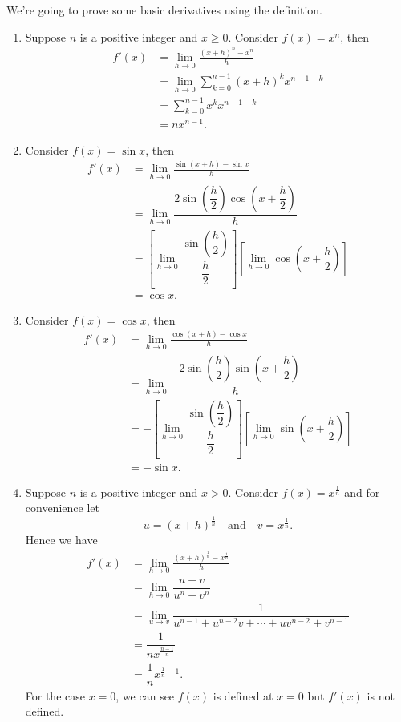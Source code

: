 \documentclass[a4paper]{ctexart}
\begin{document}
	\begin{myex}
		We're going to prove some basic derivatives using the definition.
		\begin{enumerate}
			\item Suppose $n$ is a positive integer and $x\ge 0$. Consider $f(x)=x^n$, then
			\[
			\begin{aligned}
				f'(x) &= \lim_{h\to 0} \frac{(x+h)^n - x^n}{h}\\ &= \lim_{h\to 0} \sum_{k=0}^{n-1} (x+h)^k x^{n-1-k}\\ &= \sum_{k=0}^{n-1} x^k x^{n-1-k}\\ &= n x^{n-1}.
			\end{aligned}
			\]
			\item Consider $f(x)=\sin x$, then
			\[
			\begin{aligned}
				f'(x) &= \lim_{h\to 0} \frac{\sin(x+h) - \sin x}{h}\\[6pt] 
				&= \lim_{h\to 0} \dfrac{2\sin\left(\dfrac{h}{2}\right)\cos\left(x+\dfrac{h}{2}\right)}{h}\\[6pt] 
				&= \left[ \lim_{h \to 0} \dfrac{\sin\left(\dfrac{h}{2}\right)}{\dfrac{h}{2}}\right] \left[\lim_{h \to 0} \cos\left(x+\dfrac{h}{2}\right)\right]  \\ 
				&= \cos x.
			\end{aligned}
			\]
			\item Consider $f(x)=\cos x$, then
			\[
			\begin{aligned}
				f'(x) &= \lim_{h\to 0} \frac{\cos(x+h) - \cos x}{h}\\[6pt] 
				&= \lim_{h\to 0} \dfrac{-2\sin\left(\dfrac{h}{2}\right)\sin\left(x+\dfrac{h}{2}\right)}{h}\\[6pt] 
				&= -\left[ \lim_{h \to 0} \dfrac{\sin\left(\dfrac{h}{2}\right)}{\dfrac{h}{2}}\right] \left[\lim_{h \to 0} \sin\left(x+\dfrac{h}{2}\right)\right]  \\ 
				&= -\sin x.
			\end{aligned}
			\]
			\item Suppose $n$ is a positive integer and $x>0$. Consider $f(x)=x^{\frac{1}{n}}$ and for convenience let 
			\[
			u=\left( x+h \right)^{\frac{1}{n}} \quad\text{and}\quad v=x^{\frac{1}{n}}.
			\]
			Hence we have
			\[
			\begin{aligned}
				f'(x) &= \lim_{h\to 0} \frac{(x+h)^{\frac{1}{n}} - x^{\frac{1}{n}}}{h}\\[6pt] 
				&= \lim_{h\to 0} \dfrac{u - v}{u^n - v^n} \\[6pt] 
				&= \lim_{u\to v} \dfrac{1}{u^{n-1} + u^{n-2}v + \cdots + uv^{n-2} + v^{n-1}} \\[6pt]
				&= \dfrac{1}{n x^{\frac{n-1}{n}}}\\[6pt]
				&= \dfrac{1}{n} x^{\frac{1}{n}-1}.
			\end{aligned}
			\]
			For the case $x=0$, we can see $f(x)$ is defined at $x=0$ but $f'(x)$ is not defined.
		\end{enumerate}
	\end{myex}
\end{document}
